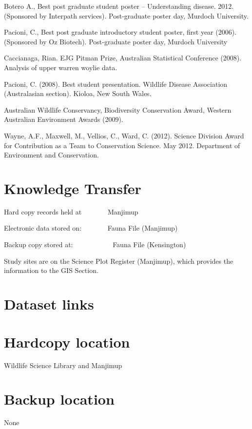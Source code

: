\documentclass[version=last,
    paper=a4,                               %
    10pt,                                   %
    dvipsnames,
    oneside,                              %
    headings=openany,                       %
    open=any,
    BCOR=7mm,                               %
    DIV=15,     %
]{scrbook}
\begin{document}
Botero A., Best post graduate student poster -- Understanding disease.
2012. (Sponsored by Interpath services). Post-graduate poster day,
Murdoch University.

Pacioni, C., Best post graduate introductory student poster, first year
(2006). (Sponsored by Oz Biotech). Post-graduate poster day, Murdoch
University

Caccianaga, Rian. EJG Pitman Prize, Australian Statistical Conference
(2008). Analysis of upper warren woylie data.

Pacioni, C. (2008). Best student presentation. Wildlife Disease
Association (Australasian section). Kioloa, New South Wales.

Australian Wildlife Conservancy, Biodiversity Conservation Award,
Western Australian Environment Awards (2009).

Wayne, A.F., Maxwell, M., Vellios, C., Ward, C. (2012). Science Division
Award for Contribution as a Team to Conservation Science. May 2012.
Department of Environment and Conservation.




\section*{Knowledge Transfer}

Hard copy records held at~~~~~~~ Manjimup

Electronic data stored on:~~~~~~~ Fauna File (Manjimup)

Backup copy stored at:~~~~~~~~~~~ Fauna File (Kensington)~ ~

Study sites are on the Science Plot Register (Manjimup), which provides
the information to the GIS Section.




\section*{Dataset links}






\section*{Hardcopy location}

Wildlife Science Library and Manjimup




\section*{Backup location}

None



\end{document}
